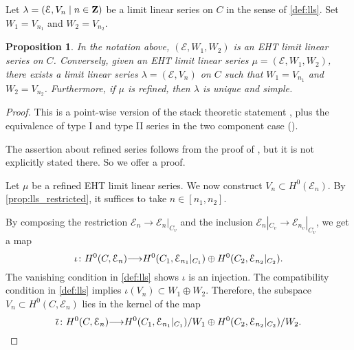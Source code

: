\documentclass[11pt,reqno]{amsart}
\theoremstyle{plain}
\newtheorem{proposition}[theorem]{Proposition}
\theoremstyle{definition}
\theoremstyle{remark}
\numberwithin{equation}{section}
\renewcommand{\to}{{\longrightarrow}}
\numberwithin{equation}{section}
\begin{document}
Let $\lambda = (\mathcal E, V_n \mid n \in {\bf Z})$ be a limit linear series on $C$ in the sense of \autoref{def:lls}.
Set $W_1 = V_{n_1}$ and $W_2 = V_{n_2}$.
\begin{proposition}\label{prop:llseht}
  In the notation above, $(\mathcal E, W_1, W_2)$ is an EHT limit linear series on $C$.
  Conversely, given an EHT limit linear series $\mu = (\mathcal E, W_1, W_2)$, there exists a limit linear series $\lambda = (\mathcal E, V_n)$ on $C$ such that $W_1 = V_{n_1}$ and $W_2 = V_{n_2}$.
  Furthermore, if $\mu$ is refined, then $\lambda$ is unique and simple.
\end{proposition}
\begin{proof}
  This is a point-wise version of the stack theoretic statement \cite[Theorem~4.3.4]{oss:14}, plus the equivalence of type I and type II series in the two component case (\cite[Remark~3.4.15]{oss:14}).

  The assertion about refined series follows from the proof of \cite[Theorem~4.3.4]{oss:14}, but it is not explicitly stated there.
  So we offer a proof.
  
  Let $\mu$ be a refined EHT limit linear series.
  We now construct $V_n \subset H^0(\mathcal E_n)$.
  By \autoref{prop:lls_restricted}, it suffices to take $n \in [n_1, n_2]$.

  By composing the restriction $\mathcal E_n \to \mathcal E_n |_{C_v}$ and the inclusion $\mathcal E_n |_{C_v} \to \mathcal E_{n_v}|_{C_v}$, we get a map
  \[ \iota \from H^0(C, \mathcal E_n) \to H^0(C_1, \mathcal E_{n_1}|_{C_1}) \oplus H^0(C_2, \mathcal E_{n_2}|_{C_2}).\]
  The vanishing condition in \autoref{def:lls} shows $\iota$ is an injection.
  The compatibility condition in \autoref{def:lls} implies  $\iota(V_n) \subset W_1 \oplus W_2$.
  Therefore, the subspace $V_n \subset H^0(C, \mathcal E_n)$ lies in the kernel of the map
  \begin{equation}\label{eqn:iotabar}
    \overline{\iota} \from H^0(C, \mathcal E_n) \to H^0(C_1, \mathcal E_{n_1}|_{C_1})/W_1 \oplus H^0(C_2, \mathcal E_{n_2}|_{C_2}) / W_2.
  \end{equation}
  

\end{proof}
\end{document}
